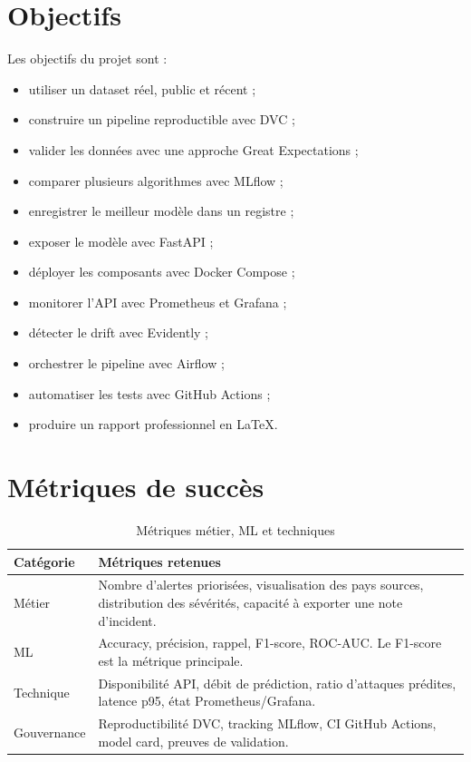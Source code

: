 \section{Objectifs}
Les objectifs du projet sont :
\begin{itemize}
  \item utiliser un dataset réel, public et récent ;
  \item construire un pipeline reproductible avec DVC ;
  \item valider les données avec une approche Great Expectations ;
  \item comparer plusieurs algorithmes avec MLflow ;
  \item enregistrer le meilleur modèle dans un registre ;
  \item exposer le modèle avec FastAPI ;
  \item déployer les composants avec Docker Compose ;
  \item monitorer l'API avec Prometheus et Grafana ;
  \item détecter le drift avec Evidently ;
  \item orchestrer le pipeline avec Airflow ;
  \item automatiser les tests avec GitHub Actions ;
  \item produire un rapport professionnel en LaTeX.
\end{itemize}

\section{Métriques de succès}
\begin{table}[H]
\centering
\caption{Métriques métier, ML et techniques}
\label{tab:success_metrics}
\begin{tabularx}{\linewidth}{@{}lY@{}}
\toprule
\textbf{Catégorie} & \textbf{Métriques retenues}\\
\midrule
Métier & Nombre d'alertes priorisées, visualisation des pays sources, distribution des sévérités, capacité à exporter une note d'incident.\\
ML & Accuracy, précision, rappel, F1-score, ROC-AUC. Le F1-score est la métrique principale.\\
Technique & Disponibilité API, débit de prédiction, ratio d'attaques prédites, latence p95, état Prometheus/Grafana.\\
Gouvernance & Reproductibilité DVC, tracking MLflow, CI GitHub Actions, model card, preuves de validation.\\
\bottomrule
\end{tabularx}
\end{table}

